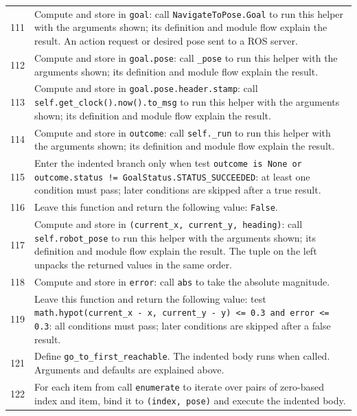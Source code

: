 \documentclass[11pt,a4paper]{book}
\begin{document}
\begin{longtable}{r p{}}
111 & Compute and store in \texttt{goal}: call \texttt{NavigateToPose.Goal} to run this helper with the arguments shown; its definition and module flow explain the result. An action request or desired pose sent to a ROS server. \\

112 & Compute and store in \texttt{goal.pose}: call \texttt{\_pose} to run this helper with the arguments shown; its definition and module flow explain the result.  \\

113 & Compute and store in \texttt{goal.pose.header.stamp}: call \texttt{self.get\_clock().now().to\_msg} to run this helper with the arguments shown; its definition and module flow explain the result.  \\

114 & Compute and store in \texttt{outcome}: call \texttt{self.\_run} to run this helper with the arguments shown; its definition and module flow explain the result.  \\

115 & Enter the indented branch only when test \texttt{outcome is None or outcome.status != GoalStatus.STATUS\_SUCCEEDED}: at least one condition must pass; later conditions are skipped after a true result. \\

116 & Leave this function and return the following value: \texttt{False}. \\

117 & Compute and store in \texttt{(current\_x, current\_y, heading)}: call \texttt{self.robot\_pose} to run this helper with the arguments shown; its definition and module flow explain the result. The tuple on the left unpacks the returned values in the same order. \\

118 & Compute and store in \texttt{error}: call \texttt{abs} to take the absolute magnitude.  \\

119 & Leave this function and return the following value: test \texttt{math.hypot(current\_x - x, current\_y - y) <= 0.3 and error <= 0.3}: all conditions must pass; later conditions are skipped after a false result. \\

121 & Define \texttt{go\_to\_first\_reachable}. The indented body runs when called. Arguments and defaults are explained above. \\

122 & For each item from call \texttt{enumerate} to iterate over pairs of zero-based index and item, bind it to \texttt{(index, pose)} and execute the indented body. \\


\end{longtable}
\end{document}
